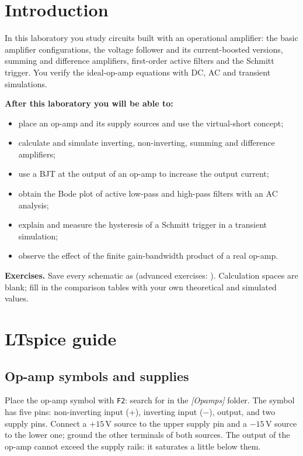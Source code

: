
\section{Introduction}
In this laboratory you study circuits built with an operational amplifier: the basic amplifier configurations, the voltage follower and its current-boosted versions, summing and difference amplifiers, first-order active filters and the Schmitt trigger. You verify the ideal-op-amp equations with DC, AC and transient simulations.

\textbf{After this laboratory you will be able to:}
\begin{itemize}
  \item place an op-amp and its supply sources and use the virtual-short concept;
  \item calculate and simulate inverting, non-inverting, summing and difference amplifiers;
  \item use a BJT at the output of an op-amp to increase the output current;
  \item obtain the Bode plot of active low-pass and high-pass filters with an AC analysis;
  \item explain and measure the hysteresis of a Schmitt trigger in a transient simulation;
  \item observe the effect of the finite gain-bandwidth product of a real op-amp.
\end{itemize}

\textbf{Exercises.} Save every schematic as  (advanced exercises: ). Calculation spaces are blank; fill in the comparison tables with your own theoretical and simulated values.

\section{LTspice guide}

\subsection{Op-amp symbols and supplies}
Place the op-amp symbol with \texttt{F2}: search for  in the \textit{[Opamps]} folder. The symbol has five pins: non-inverting input (+), inverting input ($-$), output, and two supply pins. Connect a $+15$\,V source to the upper supply pin and a $-15$\,V source to the lower one; ground the other terminals of both sources. The output of the op-amp cannot exceed the supply rails: it saturates a little below them.


